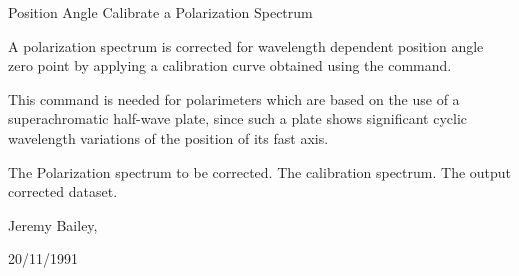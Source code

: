 \begin{manroutinedescription}
        Position Angle Calibrate a Polarization Spectrum

        A polarization spectrum is corrected for wavelength dependent
        position angle zero point by applying a calibration curve obtained
        using the {} command.

        This command is needed for polarimeters which are based on
        the use of a superachromatic half-wave plate, since such a
        plate shows significant cyclic  wavelength variations of the
        position of its fast axis.

\begin{manparametertable}
  The %
Polarization spectrum to be corrected.
  The %
calibration spectrum.
  The %
output corrected dataset.

\end{manparametertable}
        Jeremy Bailey, {}

        20/11/1991

\end{manroutinedescription}
